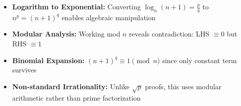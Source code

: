 \begin{takeaways}
\begin{itemize}
\item \textbf{Logarithm to Exponential:} Converting $\log_n(n+1) = \frac{p}{q}$ to $n^p = (n+1)^q$ enables algebraic manipulation
\item \textbf{Modular Analysis:} Working mod $n$ reveals contradiction: LHS $\equiv 0$ but RHS $\equiv 1$
\item \textbf{Binomial Expansion:} $(n+1)^q \equiv 1 \pmod{n}$ since only constant term survives
\item \textbf{Non-standard Irrationality:} Unlike $\sqrt{p}$ proofs, this uses modular arithmetic rather than prime factorization
\end{itemize}
\end{takeaways}
